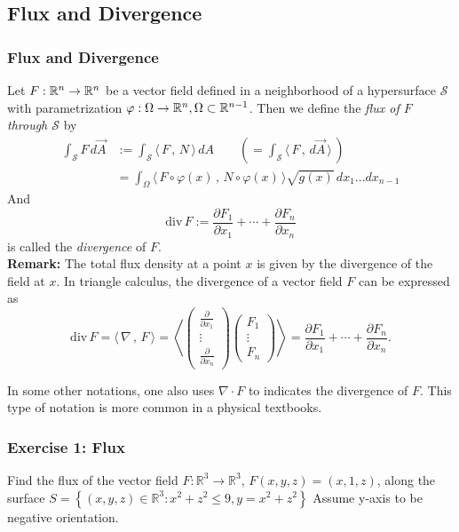 \documentclass[11pt, t]{beamer}
\renewcommand{\emph}[1]{{\color{Turquoise3}\textsl{#1}}}
\newcommand{\Remark}{\textbf{Remark: }}
\newcommand{\scp}[2]{\langle\,#1\,,\,#2\,\rangle} \newcommand{\scpp}{\langle\,\cdot\,,\,\cdot\,\rangle}
\begin{document}
\subsection{Flux and Divergence}
\begin{frame}[allowframebreaks]
    \frametitle{Flux and Divergence}
    Let $F:\mathbb{R}^{n}\to\mathbb{R}^{n}$ be a vector field defined in a neighborhood
    of a hypersurface $\mathcal{S}$ with parametrization $\varphi:\Omega\to\mathbb{R}^{n},\Omega\subset\mathbb{R}^{n-1}$. Then we define the \emph{flux of $F$ through $\mathcal{S}$} by
    \begin{equation*}
        \begin{split}
            \int_\mathcal{S}F\,d\vec{A} &:=\int_\mathcal{S}\scp{F}{N}\,dA \qquad(=\int_\mathcal{S}\scp{F}{d\vec{A}}\,)\\
            &=\int_\Omega\scp{F\circ\varphi(x)}{N\circ\varphi(x)}\sqrt{g(x)}\,dx_1...dx_{n-1}
        \end{split}
    \end{equation*}
    And
    \[\text{div}\,F:=\frac{\partial F_1}{\partial x_1}+\cdots+\frac{\partial F_n}{\partial x_n}\]
    is called the \emph{divergence} of $F$.\\[5pt]
    \Remark The total flux density at a point $x$ is given by the divergence of the field at
    $x$.\newpage
    In triangle calculus, the divergence of a vector field $F$ can be expressed as
    \[\text{div}\,F=\scp{\nabla}{F}=\left\langle{\begin{pmatrix}
                \frac{\partial}{\partial x_1} \\
                \vdots                        \\
                \frac{\partial}{\partial x_n}
            \end{pmatrix}}{\begin{pmatrix}
                F_1    \\
                \vdots \\
                F_n
            \end{pmatrix}}\right\rangle=\frac{\partial F_1}{\partial x_1}+\cdots+\frac{\partial F_n}{\partial x_n}.\]

    In some other notations, one also uses $\nabla\cdot F$ to indicates the divergence of $F$. This type of notation is more common in a physical textbooks.
\end{frame}

\begin{frame}
    \frametitle{Exercise 1: Flux}

    Find the flux of the vector field $F: \mathbb{R}^{3} \rightarrow \mathbb{R}^{3}$,
    $
        F(x, y, z)=(x, 1, z)
    $,
    along the surface $S=\left\{(x, y, z) \in \mathbb{R}^{3}: x^{2}+z^{2} \leq 9, y=x^{2}+z^{2}\right\}$ Assume y-axis to be negative orientation. 
\end{frame}
\end{document}
